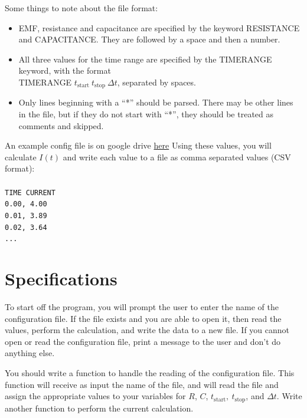 \documentclass{article}
\begin{document}
\vspace{.25cm}
Some things to note about the file format:
\begin{itemize}
	\item EMF, resistance and capacitance are specified by the keyword RESISTANCE and CAPACITANCE. They are followed by a space and then a number.
	\item All three values for the time range are specified by the TIMERANGE keyword, with the format \\TIMERANGE $t_\mathrm{start}\ t_\mathrm{stop}\ \Delta t$, separated by spaces.
	\item Only lines beginning with a ``*'' should be parsed. There may be other lines in the file, but if they do not start with ``*'', they should be treated as comments and skipped.
\end{itemize}
An example config file is on google drive \href{https://drive.google.com/file/d/1Iq_2yEz7YJZW8hYocog5oiAdUJANSY9n/view?usp=sharing}{here}
Using these values, you will calculate $I(t)$ and write each value to a file as comma separated values (CSV format):
\null\\\\
\texttt{TIME CURRENT}\\
\texttt{0.00, 4.00}\\
\texttt{0.01, 3.89}\\
\texttt{0.02, 3.64}\\
\texttt{...}\\

\section*{Specifications}
To start off the program, you will prompt the user to enter the name of the configuration file. If the file exists and you are able to open it, then read the values, perform the calculation, and write the data to a new file. If you cannot open or read the configuration file, print a message to the user and don't do anything else.

You should write a function to handle the reading of the configuration file. This function will receive as input the name of the file, and will read the file and assign the appropriate values to your variables for $R$, $C$, $t_\mathrm{start},\ t_\mathrm{stop}$, and $\Delta t$. Write another function to perform the current calculation.
\end{document}
